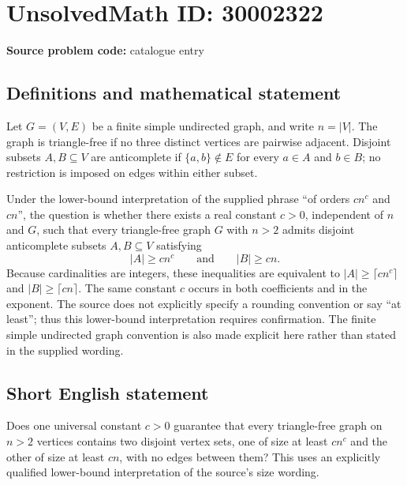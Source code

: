 \documentclass[11pt]{article}
\begin{document}
\section*{UnsolvedMath ID: 30002322}
\textbf{Source problem code:} catalogue entry
\subsection{Definitions and mathematical statement}
Let \(G=(V,E)\) be a finite simple undirected graph, and write \(n=|V|\). The graph is triangle-free if no three distinct vertices are pairwise adjacent. Disjoint subsets \(A,B\subseteq V\) are anticomplete if \(\{a,b\}\notin E\) for every \(a\in A\) and \(b\in B\); no restriction is imposed on edges within either subset.

Under the lower-bound interpretation of the supplied phrase ``of orders \(cn^c\) and \(cn\)'', the question is whether there exists a real constant \(c>0\), independent of \(n\) and \(G\), such that every triangle-free graph \(G\) with \(n>2\) admits disjoint anticomplete subsets \(A,B\subseteq V\) satisfying
\[
|A|\geq cn^c\qquad\text{and}\qquad |B|\geq cn.
\]
Because cardinalities are integers, these inequalities are equivalent to \(|A|\geq\lceil cn^c\rceil\) and \(|B|\geq\lceil cn\rceil\). The same constant \(c\) occurs in both coefficients and in the exponent. The source does not explicitly specify a rounding convention or say ``at least''; thus this lower-bound interpretation requires confirmation. The finite simple undirected graph convention is also made explicit here rather than stated in the supplied wording.
\subsection{Short English statement}
Does one universal constant \(c>0\) guarantee that every triangle-free graph on \(n>2\) vertices contains two disjoint vertex sets, one of size at least \(cn^c\) and the other of size at least \(cn\), with no edges between them? This uses an explicitly qualified lower-bound interpretation of the source's size wording.
\end{document}
